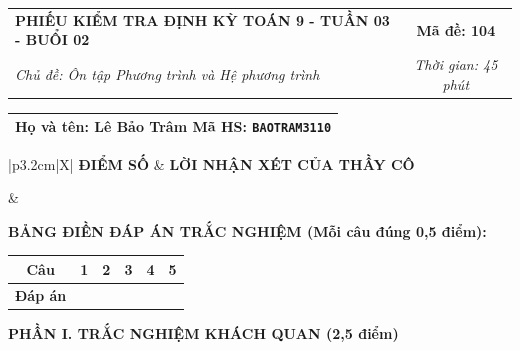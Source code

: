 \documentclass[12pt,a4paper]{article}
\begin{document}
\newpage


\noindent
\begin{tabularx}{\linewidth}{|X|c|}
\hline
\textbf{PHIẾU KIỂM TRA ĐỊNH KỲ TOÁN 9 - TUẦN 03 - BUỔI 02} & \textbf{Mã đề: 104} \\
\textit{Chủ đề: Ôn tập Phương trình và Hệ phương trình} & \textit{Thời gian: 45 phút} \\
\hline
\end{tabularx}

\vspace{1mm}

\noindent
\begin{tabularx}{\linewidth}{|X|}
\hline
\rule[-2mm]{0pt}{7.5mm}\textbf{Họ và tên:} \textbf{\large Lê Bảo Trâm} \hfill \textbf{Mã HS:} \texttt{BAOTRAM3110} \quad \\
\hline
\end{tabularx}

\vspace{1mm}

\noindent
\begin{tabularx}{\linewidth}{|p{3.2cm}|X|}
\hline
\centering\textbf{ĐIỂM SỐ} & \centering\textbf{LỜI NHẬN XÉT CỦA THẦY CÔ} \tabularnewline
\hline
\rule{0pt}{1.3cm} & \tabularnewline
\hline
\end{tabularx}

\vspace{1.2mm}

\noindent\textbf{BẢNG ĐIỀN ĐÁP ÁN TRẮC NGHIỆM (Mỗi câu đúng 0,5 điểm):}
\vspace{0.8mm}

\noindent
\renewcommand{\arraystretch}{1.35}
\begin{tabularx}{\linewidth}{|c|*{5}{>{\centering\arraybackslash}X|}}
\hline
\textbf{Câu} & \textbf{1} & \textbf{2} & \textbf{3} & \textbf{4} & \textbf{5} \\
\hline
\textbf{Đáp án} & & & & & \\
\hline
\end{tabularx}
\renewcommand{\arraystretch}{1.0}

\vspace{1.5mm}

\noindent\textbf{\large PHẦN I. TRẮC NGHIỆM KHÁCH QUAN (2,5 điểm)}
\vspace{1mm}
\end{document}
